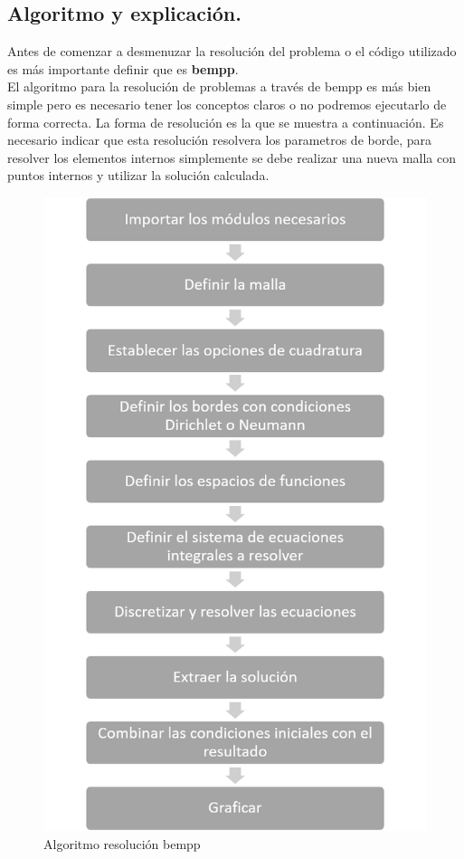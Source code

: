 \subsection{Algoritmo y explicación.}
Antes de comenzar a desmenuzar la resolución del problema o el código utilizado es más importante definir que es \textbf{bempp}\cite{bempp}.\\
 El algoritmo para la resolución de problemas a través de bempp es más bien simple pero es necesario tener los conceptos claros o no podremos ejecutarlo de forma correcta. La forma de resolución es la que se muestra a continuación. Es necesario indicar que esta resolución resolvera los parametros de borde, para resolver los elementos internos simplemente se debe realizar una nueva malla con puntos internos y utilizar la solución calculada.
 \begin{figure}[H]
 \centering
 \includegraphics[scale=0.75]{Imagenes/Algoritmo bempp.png}
 \caption{Algoritmo resolución bempp}\label{fig:Algoritmo de BEM}
 \end{figure}


